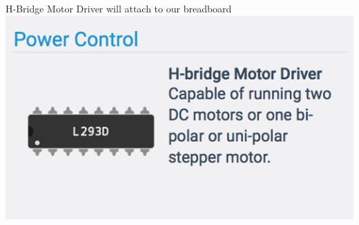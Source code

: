 \documentclass[12pt]{article}
\begin{document}
\begin{itemize}
\begin{center}
\begin{figure}[h!]
\begin{minipage}[t]{0.48\textwidth}
				\end{minipage}
			\end{figure}
			\item H-Bridge Motor Driver will attach to our breadboard
			\includegraphics[scale = 0.75]{./Images/hmotor}
		\end{center}
		

\end{itemize}
\end{document}
